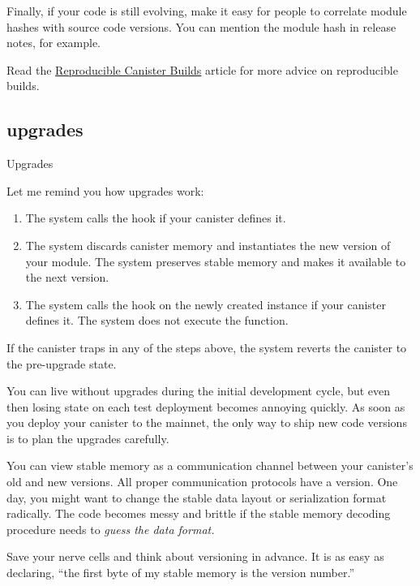 \documentclass{article}
\begin{document}
Finally, if your code is still evolving, make it easy for people to correlate module hashes with source code versions.
You can mention the module hash in release notes, for example.

Read the \href{https://smartcontracts.org/docs/developers-guide/tutorials/reproducible-builds.html}{Reproducible Canister Builds} article for more advice on reproducible builds.

\subsection{upgrades}{Upgrades}

Let me remind you how upgrades work:
\begin{enumerate}
\item The system calls the  hook if your canister defines it.
\item 
  The system discards canister memory and instantiates the new version of your module.
  The system preserves stable memory and makes it available to the next version.
\item 
  The system calls the  hook on the newly created instance if your canister defines it.
  The system does not execute the  function.
\end{enumerate}

If the canister traps in any of the steps above, the system reverts the canister to the pre-upgrade state.


You can live without upgrades during the initial development cycle, but even then losing state on each test deployment becomes annoying quickly.
As soon as you deploy your canister to the mainnet, the only way to ship new code versions is to plan the upgrades carefully.


You can view stable memory as a communication channel between your canister's old and new versions.
All proper communication protocols have a version.
One day, you might want to change the stable data layout or serialization format radically.
The code becomes messy and brittle if the stable memory decoding procedure needs to \em{guess} the data format.

Save your nerve cells and think about versioning in advance.
It is as easy as declaring, ``the first byte of my stable memory is the version number.''
\end{document}
